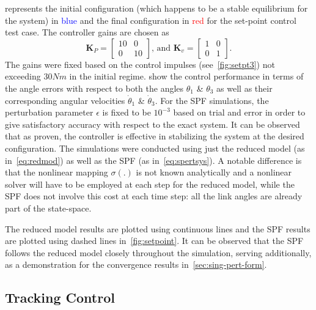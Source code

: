 \documentclass[10pt,final,journal,letterpaper,oneside,twocolumn]{IEEEtran}
\begin{document}
 represents the initial configuration (which
happens to be a stable equilibrium for the system) in
\textcolor{blue}{blue} and the final configuration in
\textcolor{red}{red} for the set-point control test case. The
controller gains are chosen as
\begin{equation}
  \bm{K}_P = \begin{bmatrix} 10 & 0\\ 0 & 10 \end{bmatrix},
  \,\text{and}\,\,
  \bm{K}_v = \begin{bmatrix} 1 & 0\\ 0 & 1 \end{bmatrix}.
  \label{eq:setptgains}
\end{equation}
The gains were fixed based on the control impulses
(see~\cref{fig:setpt3}) not exceeding
$30Nm$ in the initial regime.  show
the control performance in terms of the angle errors with respect to
both the angles $\theta_1$ \& $\theta_3$ as well as their
corresponding angular velocities $\dot{\theta}_1$ \&
$\dot{\theta}_3$. For the SPF simulations, the perturbation parameter
$\epsilon$ is fixed to be $10^{-3}$ based on trial and error in order
to give satisfactory accuracy with respect to the exact system. It can
be observed that as proven, the controller is effective in stabilizing
the system at the desired configuration. The simulations were
conducted using just the reduced model (as in~\cref{eq:redmod}) as
well as the SPF (as in~\cref{eq:spertsys}). A notable difference is
that the nonlinear mapping $\sigma(.)$ is not known analytically and a
nonlinear solver will have to be employed at each step for the reduced
model, while the SPF does not involve this cost at each time step: all
the link angles are already part of the state-space.

The reduced model results are plotted using continuous lines and the
SPF results are plotted using dashed lines in~\cref{fig:setpoint}. It
can be observed that the SPF follows the reduced model closely
throughout the simulation, serving additionally, as a demonstration
for the convergence results in~\cref{sec:sing-pert-form}.

\subsection{Tracking Control}
\label{sec:tracking-control-1}
\end{document}
